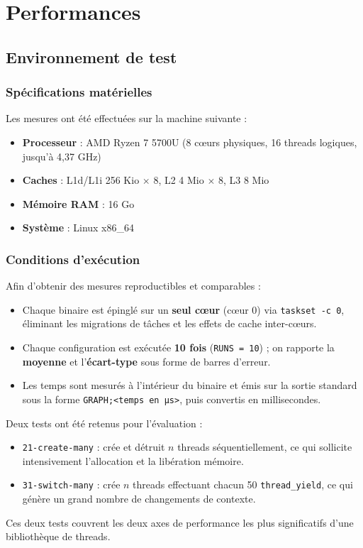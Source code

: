 \section{Performances}

\subsection{Environnement de test}

\subsubsection{Spécifications matérielles}

Les mesures ont été effectuées sur la machine suivante :

\begin{itemize}
    \item \textbf{Processeur} : AMD Ryzen 7 5700U (8 cœurs physiques, 16 threads logiques, jusqu'à 4,37 GHz)
    \item \textbf{Caches} : L1d/L1i 256 Kio $\times$ 8, L2 4 Mio $\times$ 8, L3 8 Mio
    \item \textbf{Mémoire RAM} : 16 Go
    \item \textbf{Système} : Linux x86\_64
\end{itemize}

\subsubsection{Conditions d'exécution}

Afin d'obtenir des mesures reproductibles et comparables :

\begin{itemize}
    \item Chaque binaire est épinglé sur un \textbf{seul cœur} (cœur 0) via \texttt{taskset -c 0},
          éliminant les migrations de tâches et les effets de cache inter-cœurs.
    \item Chaque configuration est exécutée \textbf{10 fois} (\texttt{RUNS = 10}) ;
          on rapporte la \textbf{moyenne} et l'\textbf{écart-type} sous forme de barres d'erreur.
    \item Les temps sont mesurés à l'intérieur du binaire et émis sur la sortie standard
          sous la forme \texttt{GRAPH;<temps en µs>}, puis convertis en millisecondes.
\end{itemize}

Deux tests ont été retenus pour l'évaluation :
\begin{itemize}
    \item \texttt{21-create-many} : crée et détruit $n$ threads séquentiellement,
          ce qui sollicite intensivement l'allocation et la libération mémoire.
    \item \texttt{31-switch-many} : crée $n$ threads effectuant chacun 50 \texttt{thread\_yield},
          ce qui génère un grand nombre de changements de contexte.
\end{itemize}
Ces deux tests couvrent les deux axes de performance les plus significatifs
d'une bibliothèque de threads.

